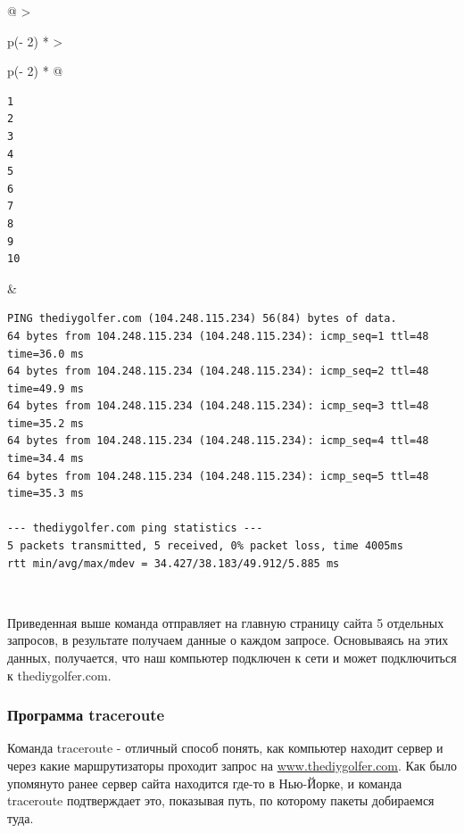 \documentclass{report}
\begin{document}
\begin{longtable}[]{@{}
  >{\raggedright\arraybackslash}p{(\columnwidth - 2\tabcolsep) * }
  >{\raggedright\arraybackslash}p{(\columnwidth - 2\tabcolsep) * }@{}}
\toprule
\endhead
\begin{minipage}[t]{\linewidth}\raggedright
\begin{verbatim}
1
2
3
4
5
6
7
8
9
10
\end{verbatim}
\end{minipage} & \begin{minipage}[t]{\linewidth}\raggedright
\begin{verbatim}
PING thediygolfer.com (104.248.115.234) 56(84) bytes of data.
64 bytes from 104.248.115.234 (104.248.115.234): icmp_seq=1 ttl=48 time=36.0 ms
64 bytes from 104.248.115.234 (104.248.115.234): icmp_seq=2 ttl=48 time=49.9 ms
64 bytes from 104.248.115.234 (104.248.115.234): icmp_seq=3 ttl=48 time=35.2 ms
64 bytes from 104.248.115.234 (104.248.115.234): icmp_seq=4 ttl=48 time=34.4 ms
64 bytes from 104.248.115.234 (104.248.115.234): icmp_seq=5 ttl=48 time=35.3 ms

--- thediygolfer.com ping statistics ---
5 packets transmitted, 5 received, 0% packet loss, time 4005ms
rtt min/avg/max/mdev = 34.427/38.183/49.912/5.885 ms
\end{verbatim}
\end{minipage} \\ \addlinespace
\bottomrule
\end{longtable}

Приведенная выше команда отправляет на главную страницу сайта 5
отдельных запросов, в результате получаем данные о каждом запросе.
Основываясь на этих данных, получается, что наш компьютер подключен к
сети и может подключиться к thediygolfer.com.

\hypertarget{traceroute}{%
\subsubsection{\texorpdfstring{\protect\hyperlink{traceroute}{}Программа
traceroute}{Программа traceroute}}\label{traceroute}}

Команда traceroute - отличный способ понять, как компьютер находит
сервер и через какие маршрутизаторы проходит запрос на
\href{http://www.thediygolfer.com}{www.thediygolfer.com}. Как было
упомянуто ранее сервер сайта находится где-то в Нью-Йорке, и команда
traceroute подтверждает это, показывая путь, по которому пакеты
добираемся туда.
\end{document}
